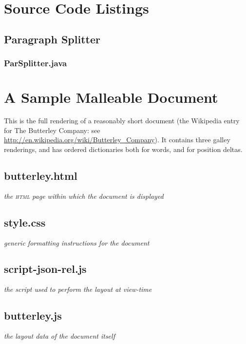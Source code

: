 \chapter{Source Code Listings}


\section{Paragraph Splitter}
\label{app:parsplitter}
\subsection{ParSplitter.java}


\newpage

\cleardoublepage
\chapter{A Sample Malleable Document}
\label{app:sampledoc}

This is the full rendering of a reasonably short document (the Wikipedia entry for The Butterley Company: see \url{http://en.wikipedia.org/wiki/Butterley_Company}). It contains three galley renderings, and has ordered dictionaries both for words, and for position deltas.

\section{butterley.html}
\emph{the \textsc{html} page within which the document is displayed}


\section{style.css}
\emph{generic formatting instructions for the document}

\newpage

\section{script-json-rel.js}
\emph{the script used to perform the layout at view-time}


\newpage

\section{butterley.js}
\emph{the layout data of the document itself}

